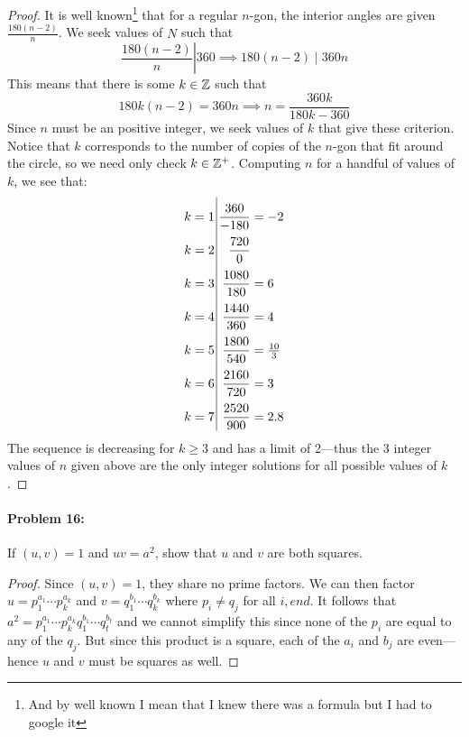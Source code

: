 \begin{proof}
  It is well known\footnote{And by well known I mean that I knew there was a
    formula but I had to google it}
  that for a regular \(n\)-gon, the interior
  angles are given \(\frac{180(n-2)}{n}\). We seek values of \(N\) such that
  \[
    \left. \frac{180(n-2)}{n} \right| 360 \implies 180(n-2) \mid 360n
  \]
  This means that there is some \(k \in \mathbb{Z} \) such that
  \[
    180k(n-2) = 360n  \implies n = \frac{360k}{180k-360}
  \]
  Since \(n\) must be an positive integer, we seek values of \(k\) that give
  these criterion. Notice that \(k\) corresponds to the number of copies of the
  \(n\)-gon that fit around the circle, so we need only check \(k \in \mathbb{Z} ^+\).
  Computing \(n\) for a handful of values of \(k\), we see that:
  \[\arraycolsep=1.4pt\def\arraystretch{2.2}
    \begin{array}{c|rl}
    k=1 & \dfrac{360}{-180} &= -2 \\
    k=2 & \dfrac{720}{0} \\
    k=3 & \dfrac{1080}{180} &= 6\\
    k=4 & \dfrac{1440}{360} &= 4 \\
    k=5 & \dfrac{1800}{540} &= \frac{10}{3} \\
    k=6 & \dfrac{2160}{720} &= 3 \\
    k=7 & \dfrac{2520}{900} &= 2.8 \\
    \end{array}
    \]
    The sequence is decreasing for \(k\geq 3\) and has a limit of 2---thus the 3
    integer values of \(n\) given above are the only integer solutions for all
    possible values of \(k\).
\end{proof}

\paragraph{Problem 16:} If \((u,v)=1\) and \(uv=a^2\), show that \(u\) and \(v\)
are both squares.

\begin{proof}
  Since \((u,v)=1\)\), they share no prime factors. We can then factor
  \(u=p_1^{a_1}\cdots p_k^{a_k}\) and \(v=q_1^{b_1}\cdots q_k^{b_k}\) where
  \(p_i\neq q_j\) for all \(i,end\). It follows that
  \(a^2=p_1^{a_1}\cdots p_k^{a_k}q_1^{b_1}\cdots q_t^{b_t}\) and we cannot
  simplify this since none of the \(p_i\) are equal to any of the \(q_j\). But
  since this product is a square, each of the \(a_i\) and \(b_j\) are
  even---hence \(u\) and \(v\) must be squares as well.
\end{proof}
